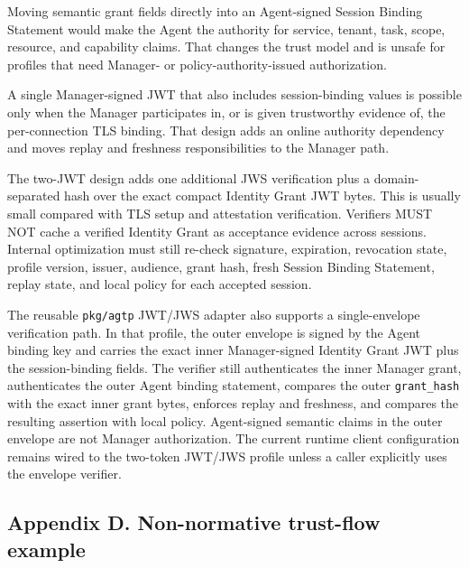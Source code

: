 \documentclass[
]{article}
\begin{document}
Moving semantic grant fields directly into an Agent-signed Session
Binding Statement would make the Agent the authority for service,
tenant, task, scope, resource, and capability claims. That changes the
trust model and is unsafe for profiles that need Manager- or
policy-authority-issued authorization.

A single Manager-signed JWT that also includes session-binding values is
possible only when the Manager participates in, or is given trustworthy
evidence of, the per-connection TLS binding. That design adds an online
authority dependency and moves replay and freshness responsibilities to
the Manager path.

The two-JWT design adds one additional JWS verification plus a
domain-separated hash over the exact compact Identity Grant JWT bytes.
This is usually small compared with TLS setup and attestation
verification. Verifiers MUST NOT cache a verified Identity Grant as
acceptance evidence across sessions. Internal optimization must still
re-check signature, expiration, revocation state, profile version,
issuer, audience, grant hash, fresh Session Binding Statement, replay
state, and local policy for each accepted session.

The reusable \texttt{pkg/agtp} JWT/JWS adapter also supports a
single-envelope verification path. In that profile, the outer envelope
is signed by the Agent binding key and carries the exact inner
Manager-signed Identity Grant JWT plus the session-binding fields. The
verifier still authenticates the inner Manager grant, authenticates the
outer Agent binding statement, compares the outer \texttt{grant\_hash}
with the exact inner grant bytes, enforces replay and freshness, and
compares the resulting assertion with local policy. Agent-signed
semantic claims in the outer envelope are not Manager authorization. The
current runtime client configuration remains wired to the two-token
JWT/JWS profile unless a caller explicitly uses the envelope verifier.

\subsection{Appendix D. Non-normative trust-flow
example}\label{appendix-d.-non-normative-trust-flow-example}
\end{document}
